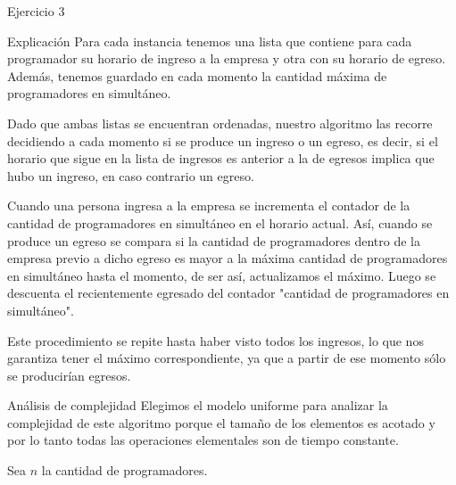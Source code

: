 \begin{section}{Ejercicio 3}
	
	\begin{subsection}{Explicación}
			Para cada instancia tenemos una lista que contiene para cada programador su horario de ingreso a la empresa y otra con su horario de egreso. Además, tenemos guardado en cada momento la cantidad máxima de programadores en simultáneo.

Dado que ambas listas se encuentran ordenadas, nuestro algoritmo las recorre decidiendo a cada momento si se produce un ingreso o un egreso, es decir, si el horario que sigue en la lista de ingresos es anterior a la de egresos implica que hubo un ingreso, en caso contrario un egreso.

Cuando una persona ingresa a la empresa se incrementa el contador de la cantidad de programadores en simultáneo en el horario actual. Así, cuando se produce un egreso se compara si la cantidad de programadores dentro de la empresa previo a dicho egreso es mayor a la máxima cantidad de programadores en simultáneo hasta el momento, de ser así, actualizamos el máximo. Luego se descuenta el recientemente egresado del contador "cantidad de programadores en simultáneo".

Este procedimiento se repite hasta haber visto todos los ingresos, lo que nos garantiza tener el máximo correspondiente, ya que a partir de ese momento sólo se producirían egresos.

		\begin{subsubsection}{Análisis de complejidad}
			Elegimos el modelo uniforme para analizar la complejidad de este algoritmo porque el tamaño de los elementos es acotado y por lo tanto todas las operaciones elementales son de tiempo constante.
			
			Sea $n$ la cantidad de programadores.\\
			

\end{subsubsection}
\end{subsection}
\end{section}
